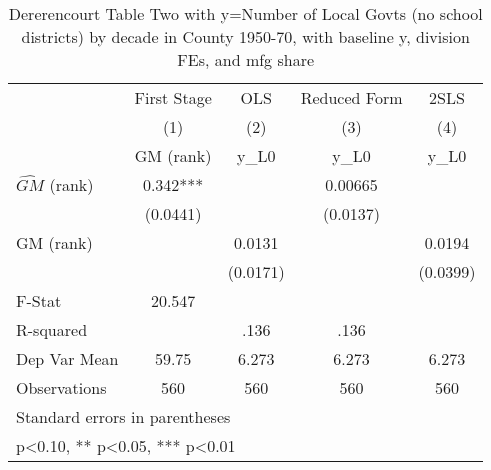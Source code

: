 \begin{table}[htbp]\centering
\def\sym#1{\ifmmode^{#1}\else\(^{#1}\)\fi}
\caption{Dererencourt Table Two with y=Number of Local Govts (no school districts) by decade in County 1950-70, with baseline y, division FEs, and mfg share}
\begin{tabular}{l*{4}{c}}
\toprule
                    & First Stage   &         OLS   &Reduced Form   &        2SLS   \\
                    &\multicolumn{1}{c}{(1)}&\multicolumn{1}{c}{(2)}&\multicolumn{1}{c}{(3)}&\multicolumn{1}{c}{(4)}\\
                    &\multicolumn{1}{c}{GM  (rank)}&\multicolumn{1}{c}{y\_L0}&\multicolumn{1}{c}{y\_L0}&\multicolumn{1}{c}{y\_L0}\\
\midrule
$\hat{GM}$ (rank)   &       0.342***&               &     0.00665   &               \\
                    &    (0.0441)   &               &    (0.0137)   &               \\
\addlinespace
GM  (rank)          &               &      0.0131   &               &      0.0194   \\
                    &               &    (0.0171)   &               &    (0.0399)   \\
\midrule
F-Stat              &      20.547   &               &               &               \\
R-squared           &               &        .136   &        .136   &               \\
Dep Var Mean        &       59.75   &       6.273   &       6.273   &       6.273   \\
Observations        &         560   &         560   &         560   &         560   \\
\bottomrule
\multicolumn{5}{l}{\footnotesize Standard errors in parentheses}\\
\multicolumn{5}{l}{\footnotesize * p<0.10, ** p<0.05, *** p<0.01}\\
\end{tabular}
\end{table}
